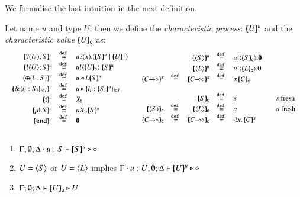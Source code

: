 We formalise the last intuition in the next definition.
%
\begin{definition}\rm
	\label{def:characteristic_process}
	\noi Let name $u$ and type $U$; then we define the {\em characteristic process}:
	$[\!\!(U)\!\!]^{u}$ and the {\em characteristic value} $[\!\!(U)\!\!]_{\mathsf{c}}$ as:
%
	\[
	\begin{array}{cc}
		\begin{array}{rclcl}
			\mapchar{\btinp{U} S}{u} &\defeq& \binp{u}{x} (\mapchar{S}{u} \Par \mapchar{U}{x})
			\\
			\mapchar{\btout{U} S}{u} &\defeq& \bout{u}{\omapchar{U}} \mapchar{S}{u} %
			\\
			\mapchar{\btsel{l : S}}{u} &\defeq& \bsel{u}{l} \mapchar{S}{u}
			\\
			\mapchar{\btbra{l_i: S_i}_{i \in I}}{u} &\defeq& \bbra{u}{l_i: \mapchar{S_i}{u}}_{i \in I}
			\\
			\mapchar{\tvar{t}}{u} &\defeq& \varp{X}_{\vart{t}}
			\\
			\mapchar{\trec{t}{S}}{u} &\defeq& \recp{X_{\vart{t}}}{\mapchar{S}{u}}
			\\
			\mapchar{\tinact}{u} &\defeq& \inact
			\\
		\end{array}
		&
		\begin{array}{rcrclcl}
			&&\mapchar{\chtype{S}}{u} &\defeq& \bout{u}{\omapchar{S}} \inact
			\\
			&&\mapchar{\chtype{L}}{u} &\defeq& \bout{u}{\omapchar{L}} \inact
			\\
			\mapchar{\shot{C}}{x} &\defeq& \mapchar{\lhot{C}}{x} &\defeq& \appl{x}{\omapchar{C}}
			\\
			\\
			&&\omapchar{S} &\defeq& s && s \textrm{ fresh}
			\\
			\omapchar{\chtype{S}} &\defeq& \omapchar{\chtype{L}} &\defeq& a && a \textrm{ fresh}
			\\
			\omapchar{\shot{C}} &\defeq& \omapchar{\lhot{C}} &\defeq& \abs{x}{\mapchar{C}{x}}
		\end{array}
	\end{array}
	\]
\end{definition}
%
%
\begin{proposition}\rm
$ $
	\begin{enumerate}[$\bullet$]
		\item	$\Gamma; \emptyset; \Delta \cdot u:S \vdash [\!\!(S)\!\!]^{u} \triangleright \diamond$
		\item	$U = \langle S \rangle$ or $U = \langle L \rangle$ implies $\Gamma \cdot u:U; \emptyset; \Delta \vdash [\!\!(U)\!\!]^{u} \triangleright \diamond$
		\item	$\Gamma; \emptyset; \Delta \vdash [\!\!(U)\!\!]_{\mathsf{c}} \triangleright U$
	\end{enumerate}
\end{proposition}

